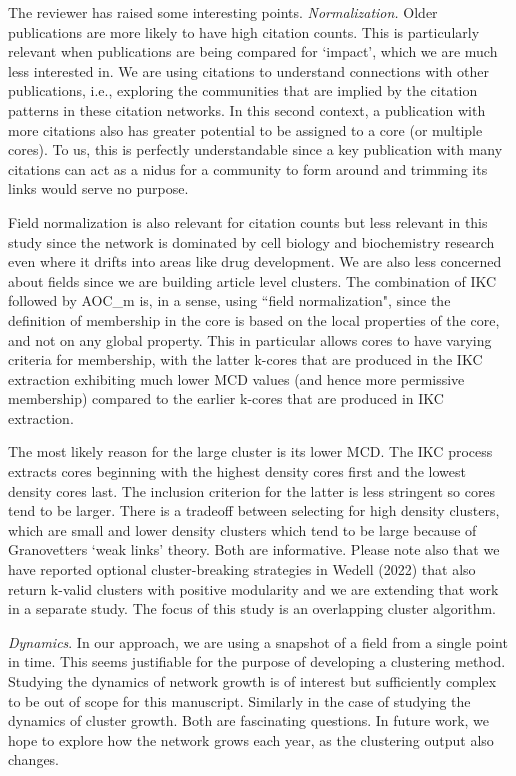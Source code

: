 \documentclass[11pt, oneside]{article}   	%
\begin{document}
The reviewer has raised some interesting points. \emph{Normalization.} Older publications are more likely to have high citation counts. This is particularly relevant when publications are being compared for `impact', which we are much less interested in. We are using citations to understand connections with other publications, i.e., exploring the communities that are implied by the citation patterns in these citation networks. In this second context, a publication with more citations also has greater potential to be assigned to a core (or multiple cores). To us, this is perfectly understandable since a key publication with many citations can act as a nidus for a community to form around and trimming its links would serve no purpose.  

Field normalization is also relevant for citation counts but less relevant in this study since the network is dominated by cell biology and biochemistry research even where it drifts into areas like drug development. We are also less concerned about fields since we are building article level clusters. The combination of IKC followed by AOC\_m is, in a sense, using ``field normalization", since the definition of membership in the core is based on the local properties of the core, and not on any global property. This in particular allows cores to have varying criteria for membership, with the latter k-cores that are produced in the IKC extraction exhibiting much lower MCD values (and hence more permissive membership) compared to the earlier k-cores that are produced in IKC extraction. 

The most likely reason for the large cluster is its lower MCD. The IKC process extracts cores beginning with the highest density cores first and the lowest density cores last. The inclusion criterion for the latter is less stringent so cores tend to be larger. There is a tradeoff between selecting for high density clusters, which are small and lower density clusters which tend to be large because of Granovetters `weak links' theory. Both are informative. Please note also that we have reported optional cluster-breaking strategies in Wedell (2022) that also return k-valid clusters with positive modularity and we are extending that work in a separate study. The focus of this study is an overlapping cluster algorithm.

\emph{Dynamics}. In our approach, we are using a snapshot of a field from a single point in time. This seems justifiable for the purpose of developing a clustering method. Studying the dynamics of network growth is of interest but sufficiently complex to be out of scope for this manuscript. Similarly in the case of studying the dynamics of cluster growth. Both are fascinating questions.  In future work,
we hope to explore how the network grows each year,  as the clustering output also changes. 
 
\end{document}
